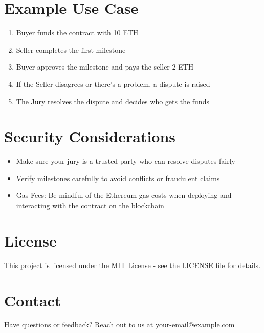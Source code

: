 \documentclass{article}
\begin{document}
\section{Example Use Case}
\begin{enumerate}
    \item Buyer funds the contract with 10 ETH
    \item Seller completes the first milestone
    \item Buyer approves the milestone and pays the seller 2 ETH
    \item If the Seller disagrees or there's a problem, a dispute is raised
    \item The Jury resolves the dispute and decides who gets the funds
\end{enumerate}

\section{Security Considerations}
\begin{itemize}
    \item Make sure your jury is a trusted party who can resolve disputes fairly
    \item Verify milestones carefully to avoid conflicts or fraudulent claims
    \item Gas Fees: Be mindful of the Ethereum gas costs when deploying and interacting with the contract on the blockchain
\end{itemize}

\section{License}
This project is licensed under the MIT License - see the LICENSE file for details.

\section{Contact}
Have questions or feedback? Reach out to us at \href{mailto:your-email@example.com}{your-email@example.com}
\end{document}
